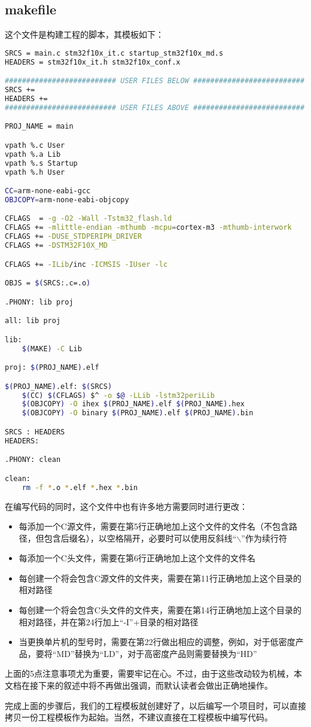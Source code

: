 \subsection{makefile}
这个文件是构建工程的脚本，其模板如下：
\begin{lstlisting}[language=bash, style=customStyleMakefile, caption=makefile]
SRCS = main.c stm32f10x_it.c startup_stm32f10x_md.s 
HEADERS = stm32f10x_it.h stm32f10x_conf.x

########################## USER FILES BELOW ##########################
SRCS += 
HEADERS += 
########################## USER FILES ABOVE ##########################

PROJ_NAME = main

vpath %.c User
vpath %.a Lib
vpath %.s Startup 
vpath %.h User

CC=arm-none-eabi-gcc
OBJCOPY=arm-none-eabi-objcopy

CFLAGS  = -g -O2 -Wall -Tstm32_flash.ld 
CFLAGS += -mlittle-endian -mthumb -mcpu=cortex-m3 -mthumb-interwork
CFLAGS += -DUSE_STDPERIPH_DRIVER
CFLAGS += -DSTM32F10X_MD

CFLAGS += -ILib/inc -ICMSIS -IUser -lc

OBJS = $(SRCS:.c=.o)

.PHONY: lib proj

all: lib proj

lib:
	$(MAKE) -C Lib 

proj: $(PROJ_NAME).elf

$(PROJ_NAME).elf: $(SRCS)
	$(CC) $(CFLAGS) $^ -o $@ -LLib -lstm32periLib
	$(OBJCOPY) -O ihex $(PROJ_NAME).elf $(PROJ_NAME).hex
	$(OBJCOPY) -O binary $(PROJ_NAME).elf $(PROJ_NAME).bin

SRCS : HEADERS
HEADERS:

.PHONY: clean

clean:
	rm -f *.o *.elf *.hex *.bin
\end{lstlisting}
\par 
在编写代码的同时，这个文件中也有许多地方需要同时进行更改：
\begin{itemize}
	\item 每添加一个C源文件，需要在第5行正确地加上这个文件的文件名（不包含路径，但包含后缀名），以空格隔开，必要时可以使用反斜线“$\backslash$”作为续行符
	\item 每添加一个C头文件，需要在第6行正确地加上这个文件的文件名
	\item 每创建一个将会包含C源文件的文件夹，需要在第11行正确地加上这个目录的相对路径
	\item 每创建一个将会包含C头文件的文件夹，需要在第14行正确地加上这个目录的相对路径，并在第24行加上“-I”+目录的相对路径
	\item 当更换单片机的型号时，需要在第22行做出相应的调整，例如，对于低密度产品，要将“MD”替换为“LD”，对于高密度产品则需要替换为“HD”
\end{itemize}
上面的5点注意事项尤为重要，需要牢记在心。不过，由于这些改动较为机械，本文档在接下来的叙述中将不再做出强调，而默认读者会做出正确地操作。
\par 
完成上面的步骤后，我们的工程模板就创建好了，以后编写一个项目时，可以直接拷贝一份工程模板作为起始。当然，不建议直接在工程模板中编写代码。

